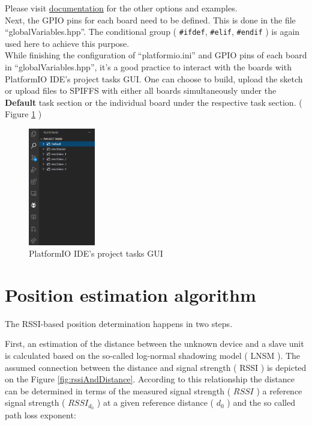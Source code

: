 \documentclass[11pt,a4paper]{article}
\numberwithin{equation}{section}   %
\numberwithin{figure}{section}     %
\numberwithin{table}{section}      %
\begin{document}
Please visit \href{https://docs.platformio.org/en/latest/projectconf/section_env.html#options}{documentation} for the other options and examples.\\

Next, the GPIO pins for each board need to be defined. This is done in the file ``globalVariables.hpp''. The conditional group ( \texttt{\#ifdef}, \texttt{\#elif}, \texttt{\#endif} ) is again used here to achieve this purpose.\\

While finishing the configuration of ``platformio.ini'' and GPIO pins of each board in ``globalVariables.hpp'', it's a good practice to interact with the boards with PlatformIO IDE's project tasks GUI. One can choose to build, upload the sketch or upload files to SPIFFS with either all boards simultaneously under the \textbf{Default} task section or the individual board under the respective task section. ( Figure \ref{fig:GUI} ) 

\begin{figure}[H]
    \centering
    \includegraphics[width = 0.26\textwidth]{figures/PlatformIOProjectTasksGUI.png}
    \caption{PlatformIO IDE's project tasks GUI}
    \label{fig:GUI}
\end{figure}


\newpage


\section{Position estimation algorithm}

The RSSI-based position determination happens in two steps.

First, an estimation of the distance between the unknown device and a slave unit is calculated based on the so-called log-normal shadowing model ( LNSM ). The assumed connection between the distance and signal strength ( RSSI ) is depicted on the Figure \ref{fig:rssiAndDistance}. According to this relationship the distance can be determined \cite{BottaSimek} in terms of the measured signal strength ( $RSSI$ ) a reference signal strength ( $RSSI_{d_0}$ ) at a given reference distance ( $d_0$ ) and the so called path loss exponent:\\
\end{document}
